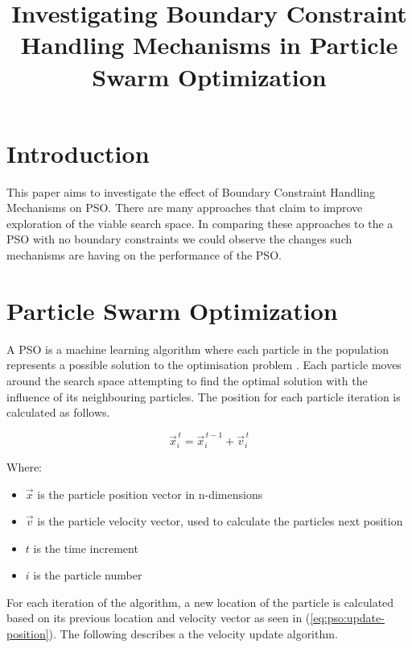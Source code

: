 \documentclass[conference]{IEEEtran}
\begin{document}
\title{Investigating Boundary Constraint Handling Mechanisms in Particle Swarm Optimization\\
}

\author{
}

\maketitle

\section{Introduction}
This paper aims to investigate the effect of Boundary Constraint Handling Mechanisms on \ac{PSO}. There are many approaches that claim to improve exploration of the viable search space. In comparing these approaches to the a \ac{PSO} with no boundary constraints we could observe the changes such mechanisms are having on the performance of the \ac{PSO}.

\section{Particle Swarm Optimization}
A \ac{PSO} is a machine learning algorithm where each particle in the population represents a possible solution to the optimisation problem \cite{anna:meas-sat-nn}. Each particle moves around the search space attempting to find the optimal solution with the influence of its neighbouring particles. The position for each particle iteration is calculated as follows.

\begin{equation} \label{eq:pso:update-position}
\vec{x}_{i}^{\,t} = \vec{x}_{i}^{\,t-1} + \vec{v}_{i}^{\,t}
\end{equation}

\noindent Where:
\begin{itemize}
	\item $ \vec{x} $ is the particle position vector in n-dimensions
	\item $ \vec{v} $ is the particle velocity vector, used to calculate the particles next position
	\item $t$ is the time increment
	\item $i$ is the particle number
\end{itemize}
\vspace{5mm}
\noindent For each iteration of the algorithm, a new location of the particle is calculated based on its previous location and velocity vector as seen in (\ref{eq:pso:update-position}). The following describes a the velocity update algorithm.
\end{document}
